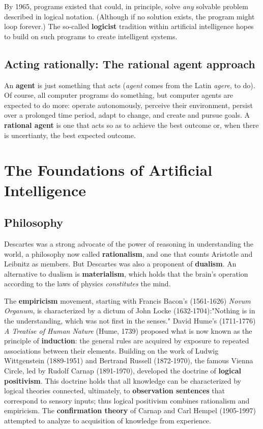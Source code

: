 \documentclass[a4paper,10pt,twoside]{book}
\begin{document}
By 1965, programs existed that could, in principle, solve \textit{any} solvable problem described in logical notation. (Although if no solution exists, the program might loop forever.) The so-called \textbf{logicist} tradition within artificial intelligence hopes to build on such programs to create intelligent systems.

\subsection{Acting rationally: The rational agent approach}

An \textbf{agent} is just something that acts (\textit{agent} comes from the Latin \textit{agere}, to do). Of course, all computer programs do something, but computer agents are expected to do more: operate autonomously, perceive their environment, persist over a prolonged time period, adapt to change, and create and pursue goals. A \textbf{rational agent} is one that acts so as to achieve the best outcome or, when there is uncertianty, the best expected outcome.

\section{The Foundations of Artificial Intelligence}

\subsection{Philosophy}

Descartes was a strong advocate of the power of reasoning in understanding the world, a philosophy now called \textbf{rationalism}, and one that counts Aristotle and Leibnitz as members. But Descartes was also a proponent of \textbf{dualism}. An alternative to dualism is \textbf{materialism}, which holds that the brain's operation according to the laws of physics \textit{constitutes} the mind.

The \textbf{empiricism} movement, starting with Francis Bacon's (1561-1626) \textit{Novum Organum}, is characterized by a dictum of John Locke (1632-1704):"Nothing is in the understanding, which was not first in the senses." David Hume's (1711-1776) \textit{A Treatise of Human Nature} (Hume, 1739) proposed what is now known as the principle of \textbf{induction}: the general rules are acquired by exposure to repeated associations between their elements. Building on the work of Ludwig Wittgenstein (1889-1951) and Bertrand Russell (1872-1970), the famous Vienna Circle, led by Rudolf Carnap (1891-1970), developed the doctrine of \textbf{logical positivism}. This doctrine holds that all knowledge can be characterized by logical theories connected, ultimately, to \textbf{observation sentences} that correspond to sensory inputs; thus logical positivism combines rationalism and empiricism. The \textbf{confirmation theory} of Carnap and Carl Hempel (1905-1997) attempted to analyze to acquisition of knowledge from experience.
\end{document}
